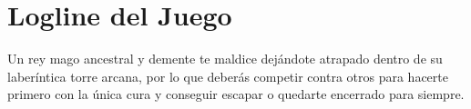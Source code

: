 \section{Logline del Juego}%

Un rey mago ancestral y demente te maldice dejándote atrapado dentro de su
laberíntica torre arcana, por lo que deberás competir contra otros para hacerte
primero con la única cura y conseguir escapar o quedarte encerrado para siempre.


